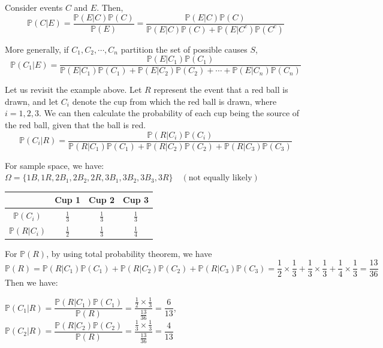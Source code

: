 \begin{theorem}
    Consider events \(C\) and \(E\). Then,
    \[
        \mathbb{P}(C \vert E) = \dfrac{\mathbb{P}(E \vert C)\mathbb{P}(C)}{\mathbb{P}(E)} = \dfrac{\mathbb{P}(E \vert C)\mathbb{P}(C)}{\mathbb{P}(E \vert C)\mathbb{P}(C) + \mathbb{P}(E \vert C^c)\mathbb{P}(C^c)}
    \]
\end{theorem}

More generally, if \(C_1, C_2, \cdots, C_n\) partition the set of possible causes \(S\), 
\[
    \mathbb{P}(C_1 \vert E) = \dfrac{\mathbb{P}(E \vert C_1)\mathbb{P}(C_1)}{\mathbb{P}(E \vert C_1)\mathbb{P}(C_1) + \mathbb{P}(E \vert C_2)\mathbb{P}(C_2) + \cdots +\mathbb{P}(E \vert C_n)\mathbb{P}(C_n)}
\]

Let us revisit the example above. Let \(R\) represent the event that a red ball is drawn, and let \(C_i\) denote the cup from which the red ball is drawn, where \(i = 1, 2, 3\). We can then calculate the probability of each cup being the source of the red ball, given that the ball is red.
\[
    \mathbb{P}(C_i \vert R) = \dfrac{\mathbb{P}(R \vert C_i)\mathbb{P}(C_i)}{\mathbb{P}(R \vert C_1)\mathbb{P}(C_1) + \mathbb{P}(R \vert C_2)\mathbb{P}(C_2) +\mathbb{P}(R \vert C_3)\mathbb{P}(C_3)}
\]

For sample space, we have: \(\Omega = \{1B, 1R, 2B_1, 2B_2, 2R, 3B_1, 3B_2, 3B_3, 3R\}\quad (\text{not equally likely}) \)
\begin{table}[H]
    \centering
    \begin{tabular}{c|c|c|c}
        \toprule
             & Cup 1 & Cup 2 & Cup 3   \\
        \midrule
            \(\mathbb{P}(C_i)\)  & \(\frac{1}{3}\)  & \(\frac{1}{3}\) & \(\frac{1}{3}\)  \\[5pt]
            \(\mathbb{P}(R \vert C_i)\)  & \(\frac{1}{2}\) & \(\frac{1}{3}\) & \(\frac{1}{4}\) \\
        \bottomrule
    \end{tabular}
\end{table}

For \(\mathbb{P}(R)\), by using total probability theorem, we have
\[
    \mathbb{P}(R) = \mathbb{P}(R \vert C_1)\mathbb{P}(C_1) + \mathbb{P}(R \vert C_2)\mathbb{P}(C_2) + \mathbb{P}(R \vert C_3)\mathbb{P}(C_3) = \dfrac{1}{2}\times\dfrac{1}{3} + \dfrac{1}{3}\times\dfrac{1}{3} + \dfrac{1}{4}\times\dfrac{1}{3} = \dfrac{13}{36}
\]
Then we have:

\(\mathbb{P}(C_1 \vert R) = \dfrac{\mathbb{P}(R \vert C_1)\mathbb{P}(C_1)}{\mathbb{P}(R)} = \dfrac{\frac{1}{2} \times \frac{1}{3}}{\frac{13}{36}} = \dfrac{6}{13}\), \(\mathbb{P}(C_2 \vert R) = \dfrac{\mathbb{P}(R \vert C_2)\mathbb{P}(C_2)}{\mathbb{P}(R)} = \dfrac{\frac{1}{3} \times \frac{1}{3}}{\frac{13}{36}} = \dfrac{4}{13}\)

